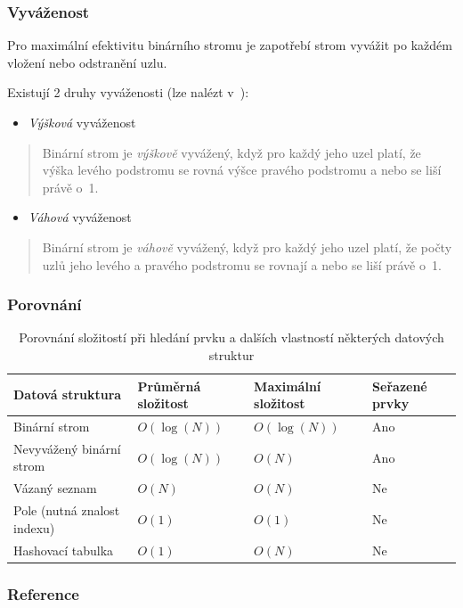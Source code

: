 \documentclass[10pt]{beamer}
\begin{document}
\begin{frame}\frametitle{Vyváženost}

    Pro maximální efektivitu binárního stromu je zapotřebí strom vyvážit po každém vložení nebo odstranění uzlu.
    
    Existují 2 druhy vyváženosti (lze nalézt v~\cite{HonzíkJanMaxmilián1991Vkzp}):
    \begin{itemize}
        \item \emph{Výšková} vyváženost
    \end{itemize}
    \begin{quote}
        Binární strom je \emph{výškově} vyvážený, když pro každý jeho uzel platí, že výška levého podstromu se rovná výšce pravého podstromu a nebo se liší právě o~1.
    \end{quote}
    
    \begin{itemize}
        \item \emph{Váhová} vyváženost
    \end{itemize}
    \begin{quote}
        Binární strom je \emph{váhově} vyvážený, když pro každý jeho uzel platí, že počty uzlů jeho levého a pravého podstromu se rovnají a nebo se liší právě o~1.
    \end{quote}
    
\end{frame}

\begin{frame}\frametitle{Porovnání}

    \renewcommand{\arraystretch}{2}
    \begin{table}[ht]
        \centering
        \begin{tabular}{|p{3.35cm}|p{1.8cm}|p{1.9cm}|p{1.7cm}|}
            \hline
            \textbf{Datová struktura} & \textbf{Průměrná složitost} & \textbf{Maximální složitost} & \textbf{Seřazené prvky} \\
            \hline
            Binární strom & $O(\log(N))$ & $O(\log(N))$ & Ano \\
            \hline
            Nevyvážený binární strom & $O(\log(N))$ & $O(N)$ & Ano \\
            \hline
            Vázaný seznam & $O(N)$ & $O(N)$ & Ne \\
            \hline
            Pole (nutná znalost indexu) & $O(1)$ & $O(1)$ & Ne \\
            \hline
            Hashovací tabulka & $O(1)$ & $O(N)$ & Ne \\
            \hline
        \end{tabular}
        \caption{Porovnání složitostí při hledání prvku a dalších vlastností některých datových struktur}
        \label{tabComparison}
    \end{table}
    
\end{frame}

\begin{frame}\frametitle{Reference}

    
    
    
\end{frame}

\end{document}
